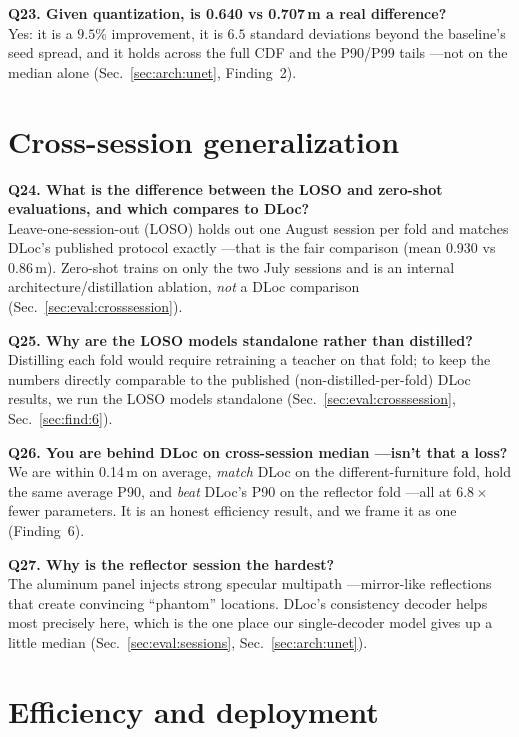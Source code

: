 \textbf{Q23. Given quantization, is 0.640 vs 0.707\,m a real difference?}\\
Yes: it is a $9.5\%$ improvement, it is $6.5$ standard deviations beyond the baseline's seed spread,
and it holds across the full CDF and the P90/P99 tails ---not on the median alone
(Sec.~\ref{sec:arch:unet}, Finding~2).

\section{Cross-session generalization}
\label{sec:qa:cross}

\textbf{Q24. What is the difference between the LOSO and zero-shot evaluations, and which compares to
DLoc?}\\
Leave-one-session-out (LOSO) holds out one August session per fold and matches DLoc's published
protocol exactly ---that is the fair comparison (mean 0.930 vs 0.86\,m). Zero-shot trains on only the
two July sessions and is an internal architecture/distillation ablation, \emph{not} a DLoc comparison
(Sec.~\ref{sec:eval:crosssession}).

\textbf{Q25. Why are the LOSO models standalone rather than distilled?}\\
Distilling each fold would require retraining a teacher on that fold; to keep the numbers directly
comparable to the published (non-distilled-per-fold) DLoc results, we run the LOSO models standalone
(Sec.~\ref{sec:eval:crosssession}, Sec.~\ref{sec:find:6}).

\textbf{Q26. You are behind DLoc on cross-session median ---isn't that a loss?}\\
We are within 0.14\,m on average, \emph{match} DLoc on the different-furniture fold, hold the same
average P90, and \emph{beat} DLoc's P90 on the reflector fold ---all at $6.8\times$ fewer parameters. It
is an honest efficiency result, and we frame it as one (Finding~6).

\textbf{Q27. Why is the reflector session the hardest?}\\
The aluminum panel injects strong specular multipath ---mirror-like reflections that create convincing
``phantom'' locations. DLoc's consistency decoder helps most precisely here, which is the one place our
single-decoder model gives up a little median (Sec.~\ref{sec:eval:sessions}, Sec.~\ref{sec:arch:unet}).

\section{Efficiency and deployment}
\label{sec:qa:deploy}

